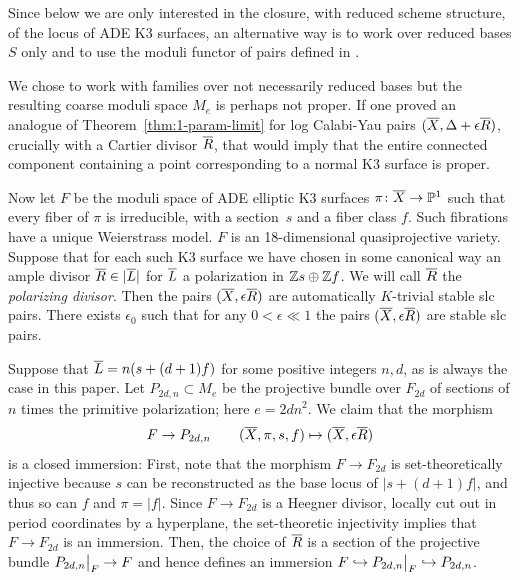 \documentclass[table,x11names]{amsart}
\begin{document}
\begin{remark}
  Since below we are only interested in the closure, with reduced
  scheme structure, of the locus of ADE K3 surfaces, an alternative
  way is to work over reduced bases $S$ only and to use the moduli
  functor of pairs defined in \cite{kovacs2017projectivity}.

  We chose
  to work with families over not necessarily reduced bases but the
  resulting coarse moduli space $M_e$ is perhaps not proper.  If one
  proved an analogue of Theorem~\ref{thm:1-param-limit} for
  log Calabi-Yau pairs $({\overline X},\Delta + \epsilon {\overline R})$,
  crucially with a Cartier divisor ${\overline R}$, 
  that would imply that the entire
  connected component containing a point corresponding to a normal K3
  surface is proper.
\end{remark}

\medskip

Now let $F$ be the moduli space of ADE elliptic K3 surfaces
$\pi\colon {\overline X}\to {\mathbb P}^1$ such that every fiber of $\pi$ is irreducible,
with a section~$s$ and a fiber class $f$.
Such fibrations have a unique Weierstrass model.
$F$ is an 18-dimensional quasiprojective variety.
Suppose that for each such K3 surface we have chosen in some
canonical way an ample divisor ${\overline R}\in |{\overline L}|$ for ${\overline L}$ a polarization in
$\mathbb{Z} s\oplus \mathbb{Z} f$. We will call ${\overline R}$ the
\emph{polarizing divisor}.
Then the pairs $({\overline X},\epsilon {\overline R})$ are automatically $K$-trivial
stable slc pairs. There exists $\epsilon_0$ such that for any
$0<\epsilon\ll1$ the pairs $({\overline X},\epsilon {\overline R})$ are stable slc pairs.

Suppose that ${\overline L} = n(s+(d+1)f)$ for some positive
integers $n,d$, as is always the case in this paper. Let $P_{2d,n}\subset M_e$
be the projective bundle over $F_{2d}$ of sections of $n$ times the
primitive polarization; here $e=2dn^2$. We claim that the morphism
\begin{displaymath} F\to P_{2d,n} \qquad ({\overline X},\pi,s,f)\mapsto
                                                ({\overline X},\epsilon{\overline R}) 
\end{displaymath} 
is a closed immersion: First, note that the morphism $F\to F_{2d}$ is set-theoretically injective
because $s$ can be reconstructed as the base locus of $|s+(d+1)f|$, and thus
so can $f$ and $\pi=|f|$. Since $F\to F_{2d}$ is a Heegner divisor, locally cut out
in period coordinates by a hyperplane, the set-theoretic injectivity
implies that $F\to F_{2d}$ is an immersion. Then, the choice of ${\overline R}$
is a section of the projective bundle $P_{2d,n}\big{|}_F\to F$
and hence defines an immersion $F\hookrightarrow P_{2d,n}\big{|}_F\hookrightarrow P_{2d,n}$. 
\end{document}
